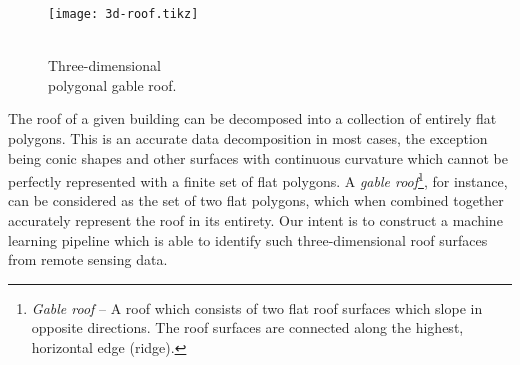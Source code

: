 \begin{wrapfigure}[10]{r}{0.25\textwidth}
  \vspace{-2em}
  \begin{center}
    \texttt{[image: 3d-roof.tikz]}
  \end{center}
  \caption{%
    \\
    Three-dimensional\\polygonal gable roof.
  }%
  \label{fig:gable-roof}
\end{wrapfigure}

The roof of a given building can be decomposed into a collection of entirely flat polygons.
This is an accurate data decomposition in most cases, the exception being conic shapes and other surfaces with continuous curvature which cannot be perfectly represented with a finite set of flat polygons.
A \emph{gable roof}\footnote{\textit{Gable roof} -- A roof which consists of two flat roof surfaces which slope in opposite directions.
The roof surfaces are connected along the highest, horizontal edge (ridge).}, for instance, can be considered as the set of two flat polygons, which when combined together accurately represent the roof in its entirety.
Our intent is to construct a machine learning pipeline which is able to identify such three-dimensional roof surfaces from remote sensing data.

